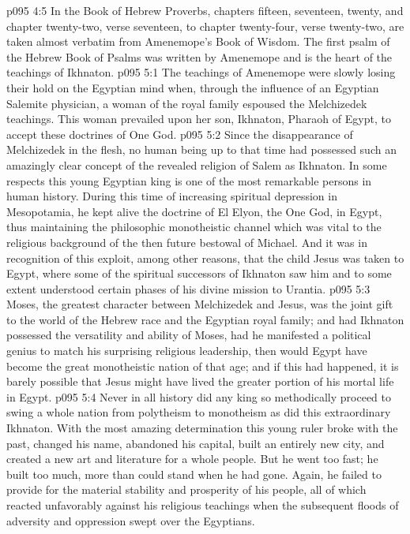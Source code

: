 \pc \vs p095 4:5 In the Book of Hebrew Proverbs, chapters fifteen, seventeen, twenty, and chapter twenty\hyp{}two, verse seventeen, to chapter twenty\hyp{}four, verse twenty\hyp{}two, are taken almost verbatim from Amenemope’s Book of Wisdom. The first psalm of the Hebrew Book of Psalms was written by Amenemope and is the heart of the teachings of Ikhnaton.
\vs p095 5:1 The teachings of Amenemope were slowly losing their hold on the Egyptian mind when, through the influence of an Egyptian Salemite physician, a woman of the royal family espoused the Melchizedek teachings. This woman prevailed upon her son, Ikhnaton, Pharaoh of Egypt, to accept these doctrines of One God.
\vs p095 5:2 Since the disappearance of Melchizedek in the flesh, no human being up to that time had possessed such an amazingly clear concept of the revealed religion of Salem as Ikhnaton. In some respects this young Egyptian king is one of the most remarkable persons in human history. During this time of increasing spiritual depression in Mesopotamia, he kept alive the doctrine of El Elyon, the One God, in Egypt, thus maintaining the philosophic monotheistic channel which was vital to the religious background of the then future bestowal of Michael. And it was in recognition of this exploit, among other reasons, that the child Jesus was taken to Egypt, where some of the spiritual successors of Ikhnaton saw him and to some extent understood certain phases of his divine mission to Urantia.
\vs p095 5:3 Moses, the greatest character between Melchizedek and Jesus, was the joint gift to the world of the Hebrew race and the Egyptian royal family; and had Ikhnaton possessed the versatility and ability of Moses, had he manifested a political genius to match his surprising religious leadership, then would Egypt have become the great monotheistic nation of that age; and if this had happened, it is barely possible that Jesus might have lived the greater portion of his mortal life in Egypt.
\vs p095 5:4 Never in all history did any king so methodically proceed to swing a whole nation from polytheism to monotheism as did this extraordinary Ikhnaton. With the most amazing determination this young ruler broke with the past, changed his name, abandoned his capital, built an entirely new city, and created a new art and literature for a whole people. But he went too fast; he built too much, more than could stand when he had gone. Again, he failed to provide for the material stability and prosperity of his people, all of which reacted unfavorably against his religious teachings when the subsequent floods of adversity and oppression swept over the Egyptians.
